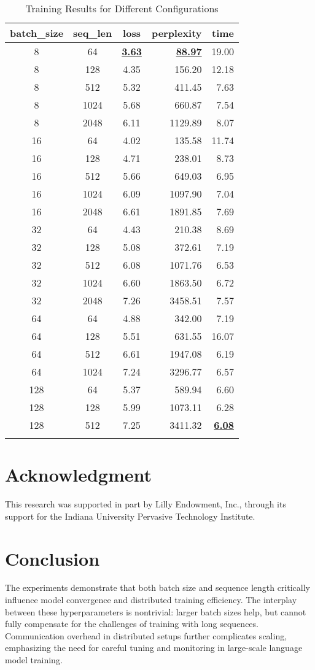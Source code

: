 \documentclass[conference]{IEEEtran}
\begin{document}
\begin{table}[htbp]
\centering
\caption{Training Results for Different Configurations}
\begin{tabular}{cccrr}
\toprule
batch\_size & seq\_len & loss & perplexity & time \\
\midrule
8 & 64 & \textbf{\underline{3.63}} & \textbf{\underline{88.97}} & 19.00 \\
8 & 128 & 4.35 & 156.20 & 12.18 \\
8 & 512 & 5.32 & 411.45 & 7.63 \\
8 & 1024 & 5.68 & 660.87 & 7.54 \\
8 & 2048 & 6.11 & 1129.89 & 8.07 \\
16 & 64 & 4.02 & 135.58 & 11.74 \\
16 & 128 & 4.71 & 238.01 & 8.73 \\
16 & 512 & 5.66 & 649.03 & 6.95 \\
16 & 1024 & 6.09 & 1097.90 & 7.04 \\
16 & 2048 & 6.61 & 1891.85 & 7.69 \\
32 & 64 & 4.43 & 210.38 & 8.69 \\
32 & 128 & 5.08 & 372.61 & 7.19 \\
32 & 512 & 6.08 & 1071.76 & 6.53 \\
32 & 1024 & 6.60 & 1863.50 & 6.72 \\
32 & 2048 & 7.26 & 3458.51 & 7.57 \\
64 & 64 & 4.88 & 342.00 & 7.19 \\
64 & 128 & 5.51 & 631.55 & 16.07 \\
64 & 512 & 6.61 & 1947.08 & 6.19 \\
64 & 1024 & 7.24 & 3296.77 & 6.57 \\
128 & 64 & 5.37 & 589.94 & 6.60 \\
128 & 128 & 5.99 & 1073.11 & 6.28 \\
128 & 512 & 7.25 & 3411.32 & \textbf{\underline{6.08}} \\
\bottomrule
\label{table:ppl-loss}
\end{tabular}
\end{table}


\section*{Acknowledgment}
This research was supported in part by Lilly Endowment, Inc., through its support for the Indiana University Pervasive Technology Institute.


\section{Conclusion}

The experiments demonstrate that both batch size and sequence length critically influence model convergence and distributed training efficiency. The interplay between these hyperparameters is nontrivial: larger batch sizes help, but cannot fully compensate for the challenges of training with long sequences. Communication overhead in distributed setups further complicates scaling, emphasizing the need for careful tuning and monitoring in large-scale language model training.



\end{document}

